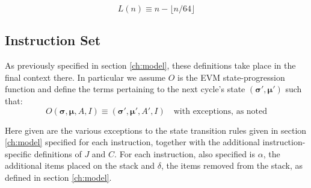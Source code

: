 \documentclass[9pt,oneside]{amsart}
\begin{document}
\begin{equation}
L(n) \equiv n - \lfloor n / 64 \rfloor
\end{equation}

\subsection{Instruction Set}

As previously specified in section \ref{ch:model}, these definitions take place in the final context there. In particular we assume $O$ is the EVM state-progression function and define the terms pertaining to the next cycle's state $(\boldsymbol{\sigma}', \boldsymbol{\mu}')$ such that:
\begin{equation}
O(\boldsymbol{\sigma}, \boldsymbol{\mu}, A, I) \equiv (\boldsymbol{\sigma}', \boldsymbol{\mu}', A', I) \quad \text{with exceptions, as noted}
\end{equation}

Here given are the various exceptions to the state transition rules given in section \ref{ch:model} specified for each instruction, together with the additional instruction-specific definitions of $J$ and $C$. For each instruction, also specified is $\alpha$, the additional items placed on the stack and $\delta$, the items removed from the stack, as defined in section \ref{ch:model}.
\end{document}
